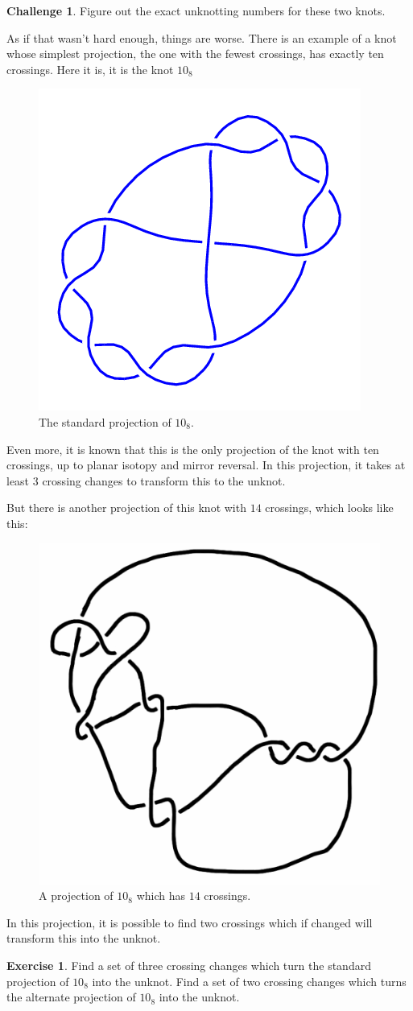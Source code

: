\documentclass[12pt,letterpaper]{article}
\theoremstyle{definition}
\newtheorem{exercise}[question]{Exercise}
\newtheorem*{challenge}{Challenge}
\begin{document}
\begin{challenge}
Figure out the exact unknotting numbers for these two knots.
\end{challenge}

As if that wasn't hard enough, things are worse.
There is an example of a knot whose simplest projection, the one with the fewest crossings, has exactly ten crossings. 
Here it is, it is the knot $10_8$
\begin{figure}[h!]
    \centering
    \includegraphics[width=.3\textwidth]{knotpics/10_8.png}
    \caption{The standard projection of $10_8$.}
\end{figure}
Even more, it is known that this is the only projection of the knot with ten crossings, up to planar isotopy and mirror reversal.
In this projection, it takes at least $3$ crossing changes to transform this to the unknot.

But there is another projection of this knot with $14$ crossings, which looks like this:
\begin{figure}[h!]
    \centering
    \includegraphics[width=.3\textwidth]{knotpics/10-8-14crossings.png}
    \caption{A projection of $10_8$ which has $14$ crossings.}
\end{figure}
In this projection, it is possible to find two crossings which if changed will transform this into the unknot.

\begin{exercise}
Find a set of three crossing changes which turn the standard projection of $10_8$ into the unknot.
Find a set of two crossing changes which turns the alternate projection of $10_8$ into the unknot.
\end{exercise}
\end{document}
